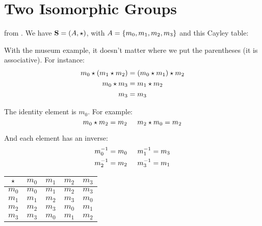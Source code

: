 \documentclass[../../../main.tex]{subfiles}
\begin{document}
\section{Two Isomorphic Groups}

 from . We have $\algebra{S} = (\set{A}, \opSymbol/)$, with $A = \{ m_{0}, m_{1}, m_{2}, m_{3} \}$ and this Cayley table:

\begin{aside}
  \begin{remark}
    With the museum example, it doesn't matter where we put the parentheses (it is associative). For instance:
    \begin{align*}
      \op{m_{0}}{(\op{m_{1}}{m_{2}})} &= \op{(\op{m_{0}}{m_{1}})}{m_{2}} \\
      \op{m_{0}}{m_{3}} &= \op{m_{1}}{m_{2}} \\
      m_{3} &= m_{3}
    \end{align*}
    
    The identity element is $m_{0}$. For example:
    \begin{equation*}
      \op{m_{0}}{m_{2}} = m_{2} \hskip 0.5cm \op{m_{2}}{m_{0}} = m_{2}
    \end{equation*}
    
    And each element has an inverse:
    \begin{align*}
      m_{0}^{-1} = m_{0} \hskip 0.5cm
      m_{1}^{-1} = m_{3} \\
      m_{2}^{-1} = m_{2} \hskip 0.5cm
      m_{3}^{-1} = m_{1}
    \end{align*}
  \end{remark}
\end{aside}

\begin{center}
  \begin{tabular}{| c || c | c | c | c |}
    \hline
    $\opSymbol/$ & $m_{0}$ & $m_{1}$ & $m_{2}$ & $m_{3}$ \\ \hline \hline
    $m_{0}$      & $m_{0}$ & $m_{1}$ & $m_{2}$ & $m_{3}$ \\ \hline
    $m_{1}$      & $m_{1}$ & $m_{2}$ & $m_{3}$ & $m_{0}$ \\ \hline
    $m_{2}$      & $m_{2}$ & $m_{3}$ & $m_{0}$ & $m_{1}$ \\ \hline
    $m_{3}$      & $m_{3}$ & $m_{0}$ & $m_{1}$ & $m_{2}$ \\ \hline
  \end{tabular}
\end{center}
\end{document}
